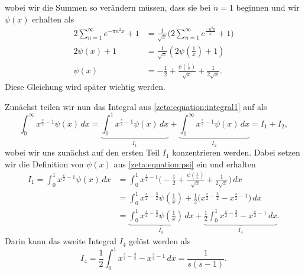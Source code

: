 wobei wir die Summen so verändern müssen, dass sie bei $n=1$ beginnen und wir $\psi(x)$ erhalten als
\begin{align}
    2
    \sum_{n=1}^{\infty}
    e^{-\pi n^2 x}
    +
    1
    &=
    \frac{1}{\sqrt{x}}
    \Biggl(
    2
    \sum_{n=1}^{\infty}
    e^{\frac{-n^2 \pi}{x}}
    +
    1
    \Biggr)
    \\
    2
    \psi(x)
    +
    1
    &=
    \frac{1}{\sqrt{x}}
    \left(
    2
    \psi\left(\frac{1}{x}\right)
    +
    1
    \right)
    \\
    \psi(x)
    &=
    - \frac{1}{2}
    + \frac{\psi\left(\frac{1}{x} \right)}{\sqrt{x}}
    + \frac{1}{2 \sqrt{x}}.\label{zeta:equation:psi}
\end{align}
Diese Gleichung wird später wichtig werden.

Zunächst teilen wir nun das Integral aus \eqref{zeta:equation:integral1} auf als
\begin{equation}\label{zeta:equation:integral2}
    \int_0^{\infty}
    x^{\frac{s}{2}-1}
    \psi(x)
    \,dx
    =
    \underbrace{
    \int_0^{1}
    x^{\frac{s}{2}-1}
    \psi(x)
    \,dx
    }_{I_1}
    +
    \underbrace{
    \int_1^{\infty}
    x^{\frac{s}{2}-1}
    \psi(x)
    \,dx
    }_{I_2}
    =
    I_1 + I_2,
\end{equation}
wobei wir uns zunächst auf den ersten Teil $I_1$ konzentrieren werden.
Dabei setzen wir die Definition von $\psi(x)$ aus \eqref{zeta:equation:psi} ein und erhalten
\begin{align}
    I_1
    =
    \int_0^{1}
    x^{\frac{s}{2}-1}
    \psi(x)
    \,dx
    &=
    \int_0^{1}
    x^{\frac{s}{2}-1}
    \Biggl(
    - \frac{1}{2}
    + \frac{\psi\left(\frac{1}{x} \right)}{\sqrt{x}}
    + \frac{1}{2 \sqrt{x}}
    \Biggr)
    \,dx
    \\
    &=
    \int_0^{1}
    x^{\frac{s}{2}-\frac{3}{2}}
    \psi \left( \frac{1}{x} \right)
    + \frac{1}{2}
    \biggl(
    x^{\frac{s}{2}-\frac{3}{2}}
    -
    x^{\frac{s}{2}-1}
    \biggl)
    \,dx
    \\
    &=
    \underbrace{
    \int_0^{1}
    x^{\frac{s}{2}-\frac{3}{2}}
    \psi \left( \frac{1}{x} \right)
    \,dx
    }_{I_3}
    +
    \underbrace{
    \frac{1}{2}
    \int_0^1
    x^{\frac{s}{2}-\frac{3}{2}}
    -
    x^{\frac{s}{2}-1}
    \,dx
    }_{I_4}. \label{zeta:equation:integral3}
\end{align}
Darin kann das zweite Integral $I_4$ gelöst werden als
\begin{equation}
    I_4
    =
    \frac{1}{2}
    \int_0^1
    x^{\frac{s}{2}-\frac{3}{2}}
    -
    x^{\frac{s}{2}-1}
    \,dx
    =
    \frac{1}{s(s-1)}.
\end{equation}
